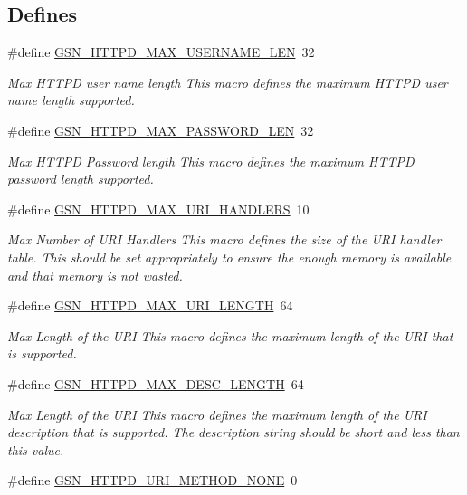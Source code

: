 \subsection*{Defines}
\begin{DoxyCompactItemize}
\item 
\#define \hyperlink{a00666_ga2a0e4d865dc418b0c680dfd0e55a91f8}{GSN\_\-HTTPD\_\-MAX\_\-USERNAME\_\-LEN}~32
\begin{DoxyCompactList}\small\item\em Max HTTPD user name length This macro defines the maximum HTTPD user name length supported. \end{DoxyCompactList}\item 
\#define \hyperlink{a00666_ga230f65ce2cb2f51b5a77ac10e8c41911}{GSN\_\-HTTPD\_\-MAX\_\-PASSWORD\_\-LEN}~32
\begin{DoxyCompactList}\small\item\em Max HTTPD Password length This macro defines the maximum HTTPD password length supported. \end{DoxyCompactList}\item 
\#define \hyperlink{a00666_ga57177849568fdcc8676db8fafcc80b74}{GSN\_\-HTTPD\_\-MAX\_\-URI\_\-HANDLERS}~10
\begin{DoxyCompactList}\small\item\em Max Number of URI Handlers This macro defines the size of the URI handler table. This should be set appropriately to ensure the enough memory is available and that memory is not wasted. \end{DoxyCompactList}\item 
\#define \hyperlink{a00666_ga95da763c129195cbff1fce21503d6406}{GSN\_\-HTTPD\_\-MAX\_\-URI\_\-LENGTH}~64
\begin{DoxyCompactList}\small\item\em Max Length of the URI This macro defines the maximum length of the URI that is supported. \end{DoxyCompactList}\item 
\#define \hyperlink{a00666_ga53602fa8c89b89819cae837fc8ba07cb}{GSN\_\-HTTPD\_\-MAX\_\-DESC\_\-LENGTH}~64
\begin{DoxyCompactList}\small\item\em Max Length of the URI This macro defines the maximum length of the URI description that is supported. The description string should be short and less than this value. \end{DoxyCompactList}\item 
\#define \hyperlink{a00666_ga824f47b1441b0279d607862e43d2fc3e}{GSN\_\-HTTPD\_\-URI\_\-METHOD\_\-NONE}~0

\end{DoxyCompactItemize}
